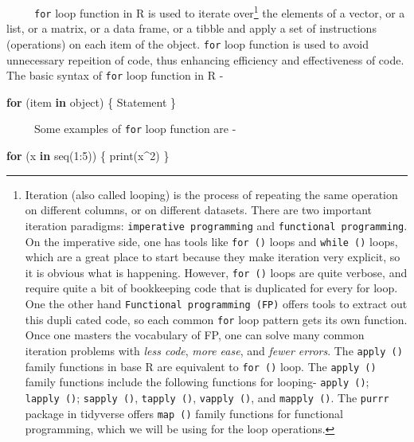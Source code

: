 \documentclass[
  letterpaper,
  DIV=11,
  numbers=noendperiod]{scrreprt}
\newenvironment{Shaded}{\begin{snugshade}}{\end{snugshade}}
\newcommand{\ControlFlowTok}[1]{\textcolor[rgb]{0.00,0.23,0.31}{\textbf{#1}}}
\newcommand{\DecValTok}[1]{\textcolor[rgb]{0.68,0.00,0.00}{#1}}
\newcommand{\FunctionTok}[1]{\textcolor[rgb]{0.28,0.35,0.67}{#1}}
\newcommand{\NormalTok}[1]{\textcolor[rgb]{0.00,0.23,0.31}{#1}}
\newcommand{\SpecialCharTok}[1]{\textcolor[rgb]{0.37,0.37,0.37}{#1}}
\begin{document}
~~~~~\texttt{for} loop function in R is used to iterate over\footnote{Iteration
  (also called looping) is the process of repeating the same operation
  on different columns, or on different datasets. There are two
  important iteration paradigms: \texttt{imperative\ programming} and
  \texttt{functional\ programming}. On the imperative side, one has
  tools like \texttt{for\ ()} loops and \texttt{while\ ()} loops, which
  are a great place to start because they make iteration very explicit,
  so it is obvious what is happening. However, \texttt{for\ ()} loops
  are quite verbose, and require quite a bit of bookkeeping code that is
  duplicated for every for loop. One the other hand
  \texttt{Functional\ programming\ (FP)} offers tools to extract out
  this dupli cated code, so each common \texttt{for} loop pattern gets
  its own function. Once one masters the vocabulary of FP, one can solve
  many common iteration problems with \emph{less code}, \emph{more
  ease}, and \emph{fewer errors}. The \texttt{apply\ ()} family
  functions in base R are equivalent to \texttt{for\ ()} loop. The
  \texttt{apply\ ()} family functions include the following functions
  for looping- \texttt{apply\ ()}; \texttt{lapply\ ()};
  \texttt{sapply\ ()}, \texttt{tapply\ ()}, \texttt{vapply\ ()}, and
  \texttt{mapply\ ()}. The \texttt{purrr} package in tidyverse offers
  \texttt{map\ ()} family functions for functional programming, which we
  will be using for the loop operations.} the elements of a vector, or a
list, or a matrix, or a data frame, or a tibble and apply a set of
instructions (operations) on each item of the object. \texttt{for} loop
function is used to avoid unnecessary repeition of code, thus enhancing
efficiency and effectiveness of code. The basic syntax of \texttt{for}
loop function in R -

\begin{Shaded}
\begin{Highlighting}[]
\ControlFlowTok{for}\NormalTok{ (item }\ControlFlowTok{in}\NormalTok{ object) \{}
\NormalTok{    Statement}
\NormalTok{\}}
\end{Highlighting}
\end{Shaded}

~~~~~Some examples of \texttt{for} loop function are -

\begin{Shaded}
\begin{Highlighting}[]
\ControlFlowTok{for}\NormalTok{ (x }\ControlFlowTok{in} \FunctionTok{seq}\NormalTok{(}\DecValTok{1}\SpecialCharTok{:}\DecValTok{5}\NormalTok{)) \{}
    \FunctionTok{print}\NormalTok{(x}\SpecialCharTok{\^{}}\DecValTok{2}\NormalTok{)}
\NormalTok{\}}
\end{Highlighting}
\end{Shaded}
\end{document}
